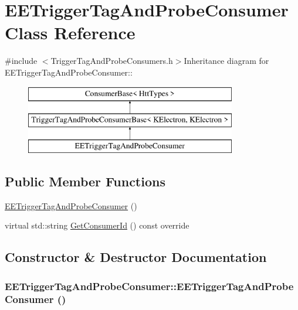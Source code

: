 \hypertarget{classEETriggerTagAndProbeConsumer}{
\section{EETriggerTagAndProbeConsumer Class Reference}
\label{classEETriggerTagAndProbeConsumer}
}


{\ttfamily \#include $<$TriggerTagAndProbeConsumers.h$>$}Inheritance diagram for EETriggerTagAndProbeConsumer::\begin{figure}[H]
\begin{center}
\leavevmode
\includegraphics[height=3cm]{classEETriggerTagAndProbeConsumer}
\end{center}
\end{figure}
\subsection*{Public Member Functions}
\begin{DoxyCompactItemize}
\item 
\hyperlink{classEETriggerTagAndProbeConsumer_a7d736c2227aa23dcae5e385b859a483a}{EETriggerTagAndProbeConsumer} ()
\item 
virtual std::string \hyperlink{classEETriggerTagAndProbeConsumer_aa26ce60c8fa7c674536f627b9000d246}{GetConsumerId} () const override
\end{DoxyCompactItemize}


\subsection{Constructor \& Destructor Documentation}
\hypertarget{classEETriggerTagAndProbeConsumer_a7d736c2227aa23dcae5e385b859a483a}{
\subsubsection[{EETriggerTagAndProbeConsumer}]{\setlength{\rightskip}{0pt plus 5cm}EETriggerTagAndProbeConsumer::EETriggerTagAndProbeConsumer ()}}
\label{classEETriggerTagAndProbeConsumer_a7d736c2227aa23dcae5e385b859a483a}


